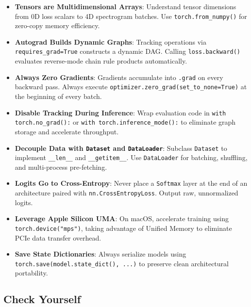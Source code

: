 \begin{takeaways}
\begin{itemize}
    \item \textbf{Tensors are Multidimensional Arrays}: Understand tensor dimensions from 0D loss scalars to 4D spectrogram batches. Use \texttt{torch.from\_numpy()} for zero-copy memory efficiency.
    \item \textbf{Autograd Builds Dynamic Graphs}: Tracking operations via \texttt{requires\_grad=True} constructs a dynamic DAG. Calling \texttt{loss.backward()} evaluates reverse-mode chain rule products automatically.
    \item \textbf{Always Zero Gradients}: Gradients accumulate into \texttt{.grad} on every backward pass. Always execute \texttt{optimizer.zero\_grad(set\_to\_none=True)} at the beginning of every batch.
    \item \textbf{Disable Tracking During Inference}: Wrap evaluation code in \texttt{with torch.no\_grad():} or \texttt{with torch.inference\_mode():} to eliminate graph storage and accelerate throughput.
    \item \textbf{Decouple Data with \texttt{Dataset} and \texttt{DataLoader}}: Subclass \texttt{Dataset} to implement \texttt{\_\_len\_\_} and \texttt{\_\_getitem\_\_}. Use \texttt{DataLoader} for batching, shuffling, and multi-process pre-fetching.
    \item \textbf{Logits Go to Cross-Entropy}: Never place a \texttt{Softmax} layer at the end of an architecture paired with \texttt{nn.CrossEntropyLoss}. Output raw, unnormalized logits.
    \item \textbf{Leverage Apple Silicon UMA}: On macOS, accelerate training using \texttt{torch.device("mps")}, taking advantage of Unified Memory to eliminate PCIe data transfer overhead.
    \item \textbf{Save State Dictionaries}: Always serialize models using \texttt{torch.save(model.state\_dict(), ...)} to preserve clean architectural portability.
\end{itemize}
\end{takeaways}

\subsection{Check Yourself}\label{subsec:pytorch_check_yourself}

